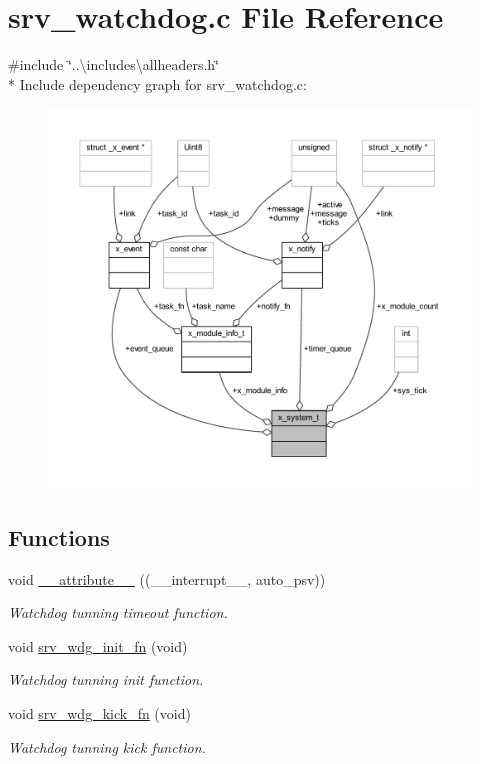\hypertarget{a00066}{\section{srv\+\_\+watchdog.\+c File Reference}
\label{a00066}
}
{\ttfamily \#include \char`\"{}..\textbackslash{}includes\textbackslash{}allheaders.\+h\char`\"{}}\\*
Include dependency graph for srv\+\_\+watchdog.\+c\+:\nopagebreak
\begin{figure}[H]
\begin{center}
\leavevmode
\includegraphics[width=350pt]{d9/df7/a01699}
\end{center}
\end{figure}
\subsection*{Functions}
\begin{DoxyCompactItemize}
\item 
void \hyperlink{a00066_a2068c3c2584547dbc1c8b9bca2d55b18}{\+\_\+\+\_\+attribute\+\_\+\+\_\+} ((\+\_\+\+\_\+interrupt\+\_\+\+\_\+, auto\+\_\+psv))
\begin{DoxyCompactList}\small\item\em Watchdog tunning timeout function. \end{DoxyCompactList}\item 
void \hyperlink{a00066_a37c35718860234f09b8cef8680e1cc09}{srv\+\_\+wdg\+\_\+init\+\_\+fn} (void)
\begin{DoxyCompactList}\small\item\em Watchdog tunning init function. \end{DoxyCompactList}\item 
void \hyperlink{a00066_ac6f811346b702c404d5e6cdfb9262767}{srv\+\_\+wdg\+\_\+kick\+\_\+fn} (void)
\begin{DoxyCompactList}\small\item\em Watchdog tunning kick function. \end{DoxyCompactList}\end{DoxyCompactItemize}
